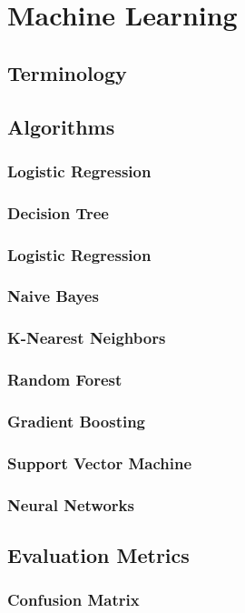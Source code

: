 \chapter{Machine Learning}
\label{chap:three}
\section{Terminology}
\section{Algorithms}
\subsection{Logistic Regression}
\subsection{Decision Tree}
\subsection{Logistic Regression}
\subsection{Naive Bayes}
\subsection{K-Nearest Neighbors}
\subsection{Random Forest}
\subsection{Gradient Boosting}
\subsection{Support Vector Machine}
\subsection{Neural Networks}
\section{Evaluation Metrics}
\subsection{Confusion Matrix}

